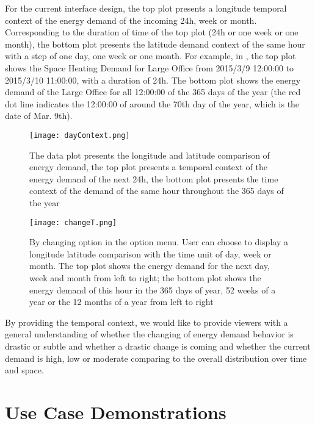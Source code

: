 For the current interface design, the top plot presents a longitude
temporal context of the energy demand of the incoming 24h, week or
month. Corresponding to the duration of time of the top plot (24h or
one week or one month), the bottom plot presents the latitude demand
context of the same hour with a step of one day, one week or one
month. For example, in , the top plot shows the
Space Heating Demand for Large Office from 2015/3/9 12:00:00 to
2015/3/10 11:00:00, with a duration of 24h. The bottom plot shows the
energy demand of the Large Office for all 12:00:00 of the 365 days of
the year (the red dot line indicates the 12:00:00 of around the 70th
day of the year, which is the date of Mar. 9th).

\begin{figure}[h!]
  \centering
  \texttt{[image: dayContext.png]}
  \caption[Data Plot with Duration / Step of One Day]{The data plot
    presents the longitude and latitude comparison of energy demand,
    the top plot presents a temporal context of the energy demand of
    the next 24h, the bottom plot presents the time context of the
    demand of the same hour throughout the 365 days of the year}
  \label{fig:dayContext}
\end{figure}

\begin{figure}[h!]
  \centering
  \texttt{[image: changeT.png]}
  \caption[Data Plot with Different Duration / Step]{By changing
    option in the option menu. User can choose to display a longitude
    latitude comparison with the time unit of day, week or month. The
    top plot shows the energy demand for the next day, week and month
    from left to right; the bottom plot shows the energy demand of
    this hour in the 365 days of year, 52 weeks of a year or the 12
    months of a year from left to right}
  \label{fig:dayContext}
\end{figure}

By providing the temporal context, we would like to provide viewers
with a general understanding of whether the changing of energy demand
behavior is drastic or subtle and whether a drastic change is coming
and whether the current demand is high, low or moderate comparing to
the overall distribution over time and space.

\pagebreak
\section{Use Case Demonstrations}
